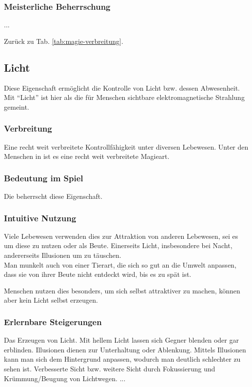 \subsubsection{Meisterliche Beherrschung} 
\begin{outline}
	\1 ...
\end{outline}
Zurück zu Tab. \ref{tab:magie-verbreitung}.



\subsection{Licht} \label{magie:licht}
Diese Eigenschaft ermöglicht die Kontrolle von Licht bzw. dessen Abwesenheit.
Mit "`Licht"' ist hier als die für Menschen sichtbare elektromagnetische Strahlung gemeint.

\subsubsection{Verbreitung}
Eine recht weit verbreitete Kontrollfähigkeit unter diversen Lebewesen. 
Unter den Menschen in  ist es eine recht weit verbreitete Magieart.

\subsubsection{Bedeutung im Spiel}
Die  beherrscht diese Eigenschaft. 

\subsubsection{Intuitive Nutzung}
Viele Lebewesen verwenden dies zur Attraktion von anderen Lebewesen, sei es um diese zu nutzen oder als Beute.
Einerseits Licht, insbesondere bei Nacht, andererseits Illusionen um zu täuschen. \\
Man munkelt auch von einer Tierart, die sich so gut an die Umwelt anpassen, dass sie von ihrer Beute nicht entdeckt wird, bis es zu spät ist. 

Menschen nutzen dies besonders, um sich selbst attraktiver zu machen, können aber kein Licht selbst erzeugen.

\subsubsection{Erlernbare Steigerungen}
\begin{outline}
	\1 Das Erzeugen von Licht.
	\1 Mit hellem Licht lassen sich Gegner blenden oder gar erblinden.
	\1 Illusionen dienen zur Unterhaltung oder Ablenkung.
	\1 Mittels Illusionen kann man sich dem Hintergrund anpassen, wodurch man deutlich schlechter zu sehen ist.
	\1 Verbesserte Sicht bzw. weitere Sicht durch Fokussierung und Krümmung/Beugung von Lichtwegen.
	\1 ...
\end{outline}

